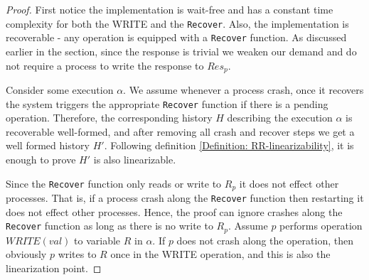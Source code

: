 \begin{proof}
	First notice the implementation is wait-free and has a constant time complexity for both the WRITE and the \texttt{Recover}. Also, the implementation is recoverable - any operation is equipped with a \texttt{Recover} function. As discussed earlier in the section, since the response is trivial we weaken our demand and do not require a process to write the response to $Res_p$.
	
	Consider some execution $\alpha$. We assume whenever a process crash, once it recovers the system triggers the appropriate \texttt{Recover} function if there is a pending operation. Therefore, the corresponding history $H$ describing the execution $\alpha$ is recoverable well-formed, and after removing all crash and recover steps we get a well formed history $H'$. Following definition \ref{Definition: RR-linearizability}, it is enough to prove $H'$ is also linearizable.
	
	Since the \texttt{Recover} function only reads or write to $R_p$ it does not effect other processes. That is, if a process crash along the \texttt{Recover} function then restarting it does not effect other processes.
	Hence, the proof can ignore crashes along the \texttt{Recover} function as long as there is no write to $R_p$.
	Assume $p$ performs operation $WRITE(val)$ to variable $R$ in $\alpha$. If $p$ does not crash along the operation, then obviously $p$ writes to $R$ once in the WRITE operation, and this is also the linearization point.
	

\end{proof}
